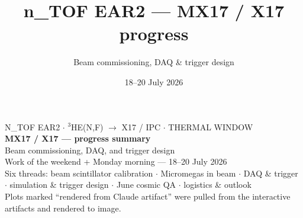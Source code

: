 \documentclass[aspectratio=169,10pt]{beamer}
\title{\textbf{n\_TOF EAR2 --- MX17 / X17 progress}}
\subtitle{Beam commissioning, DAQ \& trigger design}
\date{18--20 July 2026}
\begin{document}
{
\begin{frame}[plain]
  \vspace{0.6em}
  {\color{SlateL}\footnotesize N\_TOF EAR2 $\cdot$ $^3$HE(N,F) $\to$ X17 / IPC $\cdot$ THERMAL WINDOW}\\[1.2em]
  {\Huge\bfseries\color{TealD} MX17 / X17 --- progress summary}\\[0.6em]
  {\large\color{Slate} Beam commissioning, DAQ, and trigger design}\\[0.3em]
  {\color{SlateL} Work of the weekend + Monday morning --- 18--20 July 2026}\\[1.6em]
  {\footnotesize\color{SlateL} Six threads: beam scintillator calibration $\cdot$ Micromegas in beam $\cdot$ DAQ \& trigger
  $\cdot$ simulation \& trigger design $\cdot$ June cosmic QA $\cdot$ logistics \& outlook}\\[0.8em]
  {\scriptsize\color{Amber} Plots marked ``rendered from Claude artifact'' were pulled from the interactive artifacts and rendered to image.}
\end{frame}}
\end{document}
